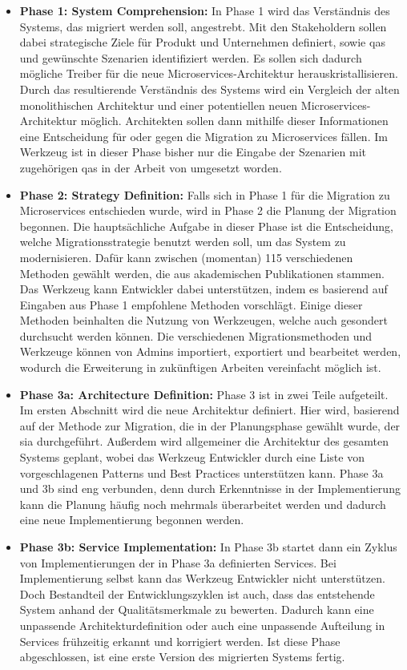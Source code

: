 \begin{itemize}
	\item \textbf{Phase 1: System Comprehension:}
	In Phase 1 wird das Verständnis des Systems, das migriert werden soll, angestrebt.
	Mit den Stakeholdern sollen dabei strategische Ziele für Produkt und Unternehmen definiert, sowie \glspl{qa} und gewünschte Szenarien identifiziert werden.
	Es sollen sich dadurch mögliche Treiber für die neue Microservices-Architektur herauskristallisieren.
	Durch das resultierende Verständnis des Systems wird ein Vergleich der alten monolithischen Architektur und einer potentiellen neuen Microservices-Architektur möglich.
	Architekten sollen dann mithilfe dieser Informationen eine Entscheidung für oder gegen die Migration zu Microservices fällen.
	Im Werkzeug ist in dieser Phase bisher nur die Eingabe der Szenarien mit zugehörigen \glspl{qa} in der Arbeit von  umgesetzt worden.
	\item \textbf{Phase 2: Strategy Definition:}
	Falls sich in Phase 1 für die Migration zu Microservices entschieden wurde, wird in Phase 2 die Planung der Migration begonnen.
	Die hauptsächliche Aufgabe in dieser Phase ist die Entscheidung, welche Migrationsstrategie benutzt werden soll, um das System zu modernisieren.
	Dafür kann zwischen (momentan) 115 verschiedenen Methoden gewählt werden, die aus akademischen Publikationen stammen.
	Das Werkzeug kann Entwickler dabei unterstützen, indem es basierend auf Eingaben aus Phase 1 empfohlene Methoden vorschlägt.
	Einige dieser Methoden beinhalten die Nutzung von Werkzeugen, welche auch gesondert durchsucht werden können.
	Die verschiedenen Migrationsmethoden und Werkzeuge können von Admins importiert, exportiert und bearbeitet werden, wodurch die Erweiterung in zukünftigen Arbeiten vereinfacht möglich ist.
	\item \textbf{Phase 3a: Architecture Definition:}
	Phase 3 ist in zwei Teile aufgeteilt.
	Im ersten Abschnitt wird die neue Architektur definiert.
	Hier wird, basierend auf der Methode zur Migration, die in der Planungsphase gewählt wurde, der \gls{sia} durchgeführt.
	Außerdem wird allgemeiner die Architektur des gesamten Systems geplant, wobei das Werkzeug Entwickler durch eine Liste von vorgeschlagenen Patterns und Best Practices unterstützen kann.
	 Phase 3a und 3b sind eng verbunden, denn durch Erkenntnisse in der Implementierung kann die Planung häufig noch mehrmals überarbeitet werden und dadurch eine neue Implementierung begonnen werden.
	\item \textbf{Phase 3b: Service Implementation:} In Phase 3b startet dann ein Zyklus von Implementierungen der in Phase 3a definierten Services.
	Bei Implementierung selbst kann das Werkzeug Entwickler nicht unterstützen.
	Doch Bestandteil der Entwicklungszyklen ist auch, dass das entstehende System anhand der Qualitätsmerkmale zu bewerten.
	Dadurch kann eine unpassende Architekturdefinition oder auch eine unpassende Aufteilung in Services frühzeitig erkannt und korrigiert werden.
	Ist diese Phase abgeschlossen, ist eine erste Version des migrierten Systems fertig.
\end{itemize}

